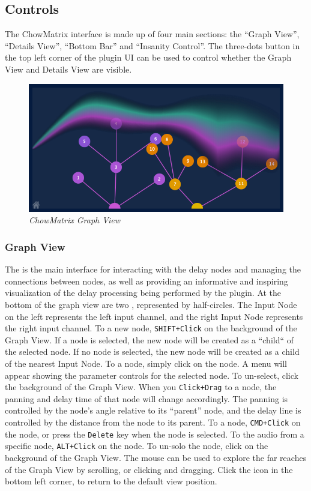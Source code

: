 \documentclass[landscape,twocolumn,a5paper]{manual}
\newcommand\shortcut[1]{\colorbox{highlightcolour}{\texttt{#1}}}
\begin{document}
\subsection{Controls}
The ChowMatrix interface is made up of four main sections:
the ``Graph View'', ``Details View'', ``Bottom Bar''
and ``Insanity Control''. The three-dots button in the
top left corner of the plugin UI can be used to control
whether the Graph View and Details View are visible.

\begin{figure}[ht]
    \center
    \includegraphics[width=0.8\columnwidth]{screenshots/GraphView.png}
    \caption{\label{fig:graph_view}{\it ChowMatrix Graph View}}
\end{figure}

\subsubsection{Graph View}
The  is the main interface for interacting
with the delay nodes and managing the connections between nodes,
as well as providing an informative and inspiring visualization
of the delay processing being performed by the plugin.
\newpar
At the bottom of the graph view are two ,
represented by half-circles. The Input Node on the left represents
the left input channel, and the right Input Node represents the right
input channel.
\newpar
To  a new
node, \shortcut{SHIFT+Click} on the background of the Graph
View. If a node is selected, the new node will be created
as a ``child`` of the selected node. If no node is selected,
the new node will be created as a child of the nearest Input
Node.
\newpar
To  a node, simply click on the node. A menu
will appear showing the parameter controls for the selected node.
To un-select, click the background of the Graph View.
\newpar
When you \shortcut{Click+Drag} to  a node,
the panning and delay time of that node will change accordingly.
The panning is controlled by the node's angle relative to its
``parent'' node, and the delay line is controlled by the distance
from the node to its parent.
\newpar
To  a node,
\shortcut{CMD+Click} on the node, or press the \shortcut{Delete}
key when the node is selected.
\newpar
To  the audio from a specific node,
\shortcut{ALT+Click} on the node. To un-solo the node,
click on the background of the Graph View.
\newpar
The mouse can be used to explore the far reaches of the
Graph View by scrolling, or clicking and dragging. Click
the  icon in the bottom left corner, to
return to the default view position.
\end{document}
